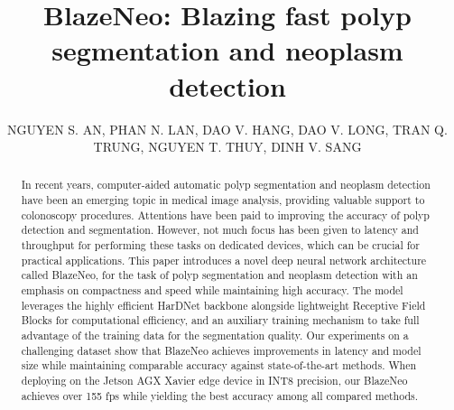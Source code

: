 \documentclass{ieeeaccess}
\newcommand{\ModelName}{BlazeNeo\xspace}
\begin{document}
\title{\ModelName{}: Blazing fast polyp segmentation and neoplasm detection}










\author{
    \uppercase{Nguyen S. An},
    \uppercase{Phan N. Lan},
    \uppercase{Dao V. Hang},
    \uppercase{Dao V. Long},
    \uppercase{Tran Q. Trung},
    \uppercase{Nguyen T. Thuy},
    \uppercase{Dinh V. Sang}
}

\address[1]{Hanoi University of Science and Technology, Hanoi, Vietnam}
\address[2]{Hanoi Medical University, Hanoi, Vietnam}
\address[3]{Institute of Gastroenterology and Hepatology, Hanoi, Vietnam}
\address[4]{University of Medicine and Pharmacy, Hue University, Hue, Vietnam}
\address[5]{Faculty of Information Technology, Vietnam National University of Agriculture, Hanoi, Vietnam}






\begin{abstract}
    In recent years, computer-aided automatic polyp segmentation and neoplasm detection have been an emerging topic in medical image analysis, providing valuable support to colonoscopy procedures. Attentions have been paid to improving the accuracy of polyp detection and segmentation. However, not much focus has been given to latency and throughput for performing these tasks on dedicated devices, which can be crucial for practical applications. This paper introduces a novel deep neural network architecture called \ModelName, for the task of polyp segmentation and neoplasm detection with an emphasis on compactness and speed while maintaining high accuracy. The model leverages the highly efficient HarDNet backbone alongside lightweight Receptive Field Blocks for computational efficiency, and an auxiliary training mechanism to take full advantage of the training data for the segmentation quality. Our experiments on a challenging dataset show that \ModelName achieves improvements in latency and model size while maintaining comparable accuracy against state-of-the-art methods. When deploying on the Jetson AGX Xavier edge device in INT8 precision, our \ModelName achieves over 155 fps while yielding the best accuracy among all compared methods.
\end{abstract}
\end{document}
